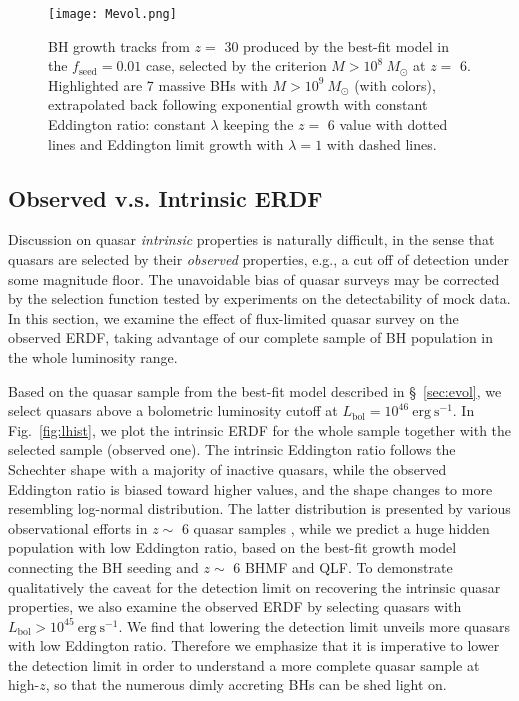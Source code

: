 \documentclass[twocolumn, twocolappendix]{aastex63}
\newcommand{\Msun}{M_\odot}
\newcommand{\fseed}{f_\mathrm{seed}}
\newcommand{\Lbol}{L_\mathrm{bol}}
\begin{document}
\begin{CJK*}{UTF8}{gbsn}
\begin{figure}
\centering
\texttt{[image: Mevol.png]}
\caption{
BH growth tracks from $z=$ 30 produced by the best-fit model in the $\fseed=0.01$ case, 
selected by the criterion $M>10^8~\Msun$ at $z=$ 6. 
Highlighted are 7 massive BHs with $M>10^9~\Msun$ (with colors), 
extrapolated back following exponential growth with constant Eddington ratio: 
constant $\lambda$ keeping the $z=$ 6 value with dotted lines and 
Eddington limit growth with $\lambda=1$ with dashed lines.
}
\label{fig:track}
\end{figure}

\vspace{2mm}
\subsection{Observed v.s. Intrinsic ERDF}\label{sec:ldist}
Discussion on quasar \textit{intrinsic} properties is naturally difficult, 
in the sense that quasars are selected by their \textit{observed} properties, 
e.g., a cut off of detection under some magnitude floor. 
The unavoidable bias of quasar surveys may be corrected by the selection function tested 
by experiments on the detectability of mock data.
In this section, we examine the effect of flux-limited quasar survey on the observed ERDF, 
taking advantage of our complete sample of BH population in the whole luminosity range. 

Based on the quasar sample from the best-fit model described in \S~\ref{sec:evol}, 
we select quasars above a bolometric luminosity cutoff at $\Lbol=10^{46}~\mathrm{erg~s^{-1}}$. 
In Fig.~\ref{fig:lhist}, we plot the intrinsic ERDF for the whole sample together with 
the selected sample (observed one). 
The intrinsic Eddington ratio follows the Schechter shape with a majority of inactive quasars, 
while the observed Eddington ratio is biased toward higher values, and the shape changes to 
more resembling log-normal distribution. 
The latter distribution is presented by various observational efforts in $z\sim$ 6 quasar samples
\citep[e.g.,][]{2010AJ....140..546W,2019ApJ...873...35S}, 
while we predict a huge hidden population with low Eddington ratio, 
based on the best-fit growth model connecting the BH seeding and $z\sim$ 6 BHMF and QLF. 
To demonstrate qualitatively the caveat for the detection limit on recovering the intrinsic quasar properties, 
we also examine the observed ERDF by selecting quasars with $\Lbol>10^{45}~\mathrm{erg~s^{-1}}$. 
We find that lowering the detection limit unveils more quasars with low Eddington ratio. 
Therefore we emphasize that it is imperative to lower the detection limit in order to 
understand a more complete quasar sample at high-$z$, 
so that the numerous dimly accreting BHs can be shed light on.




\end{CJK*}
\end{document}
